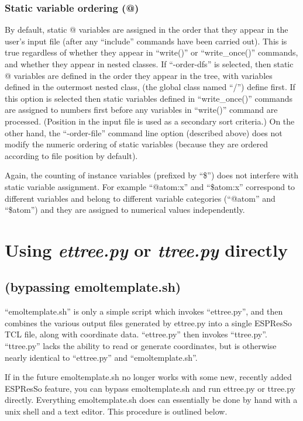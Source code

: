 \documentclass[11pt]{article}
\begin{document}
\subsubsection*{Static variable ordering (@)}

By default, static @ variables are assigned in the order that 
they appear in the user's input file 
(after any ``include'' commands have been carried out). 
This is true regardless of whether they appear in 
``write()'' or ``write\_once()'' commands,
and whether they appear in nested classes.
If ``-order-dfs'' is selected, then static @ variables are defined 
in the order they appear in the tree,
with variables defined in the outermost nested class, 
(the global class named ``/'') define first.
If this option is selected then static variables defined in 
``write\_once()'' commands are assigned to numbers first
before any variables in ``write()'' command are processed.
(Position in the input file is used as a secondary sort criteria.)
On the other hand, the ``-order-file'' command line option 
(described above) does not modify the numeric ordering of static variables 
(because they are ordered according to file position by default).

Again, the counting of instance variables (prefixed by ``\$'') 
does not interfere with static variable assignment.
For example ``@atom:x'' and ``\$atom:x'' 
correspond to different variables and 
belong to different variable categories
(``@atom'' and ``\$atom'')
and they are assigned to numerical values independently.


\section{Using \textit{ettree.py} or \textit{ttree.py} directly}
\subsection*{(bypassing emoltemplate.sh)}
\label{sec:ttree}

``emoltemplate.sh'' is only a simple script which invokes ``ettree.py'', 
and then combines the various output files generated by ettree.py into a 
single ESPResSo TCL file, along with coordinate data.
``ettree.py'' then invokes ``ttree.py''.
``ttree.py'' lacks the ability to read or generate coordinates, but 
is otherwise nearly identical to ``ettree.py'' and ``emoltemplate.sh''.

If in the future emoltemplate.sh no longer works with some new, recently added 
ESPResSo feature, you can bypass emoltemplate.sh and run ettree.py
or ttree.py directly.
Everything emoltemplate.sh does can essentially be done by hand with
a unix shell and a text editor.  This procedure is outlined below.
\end{document}
